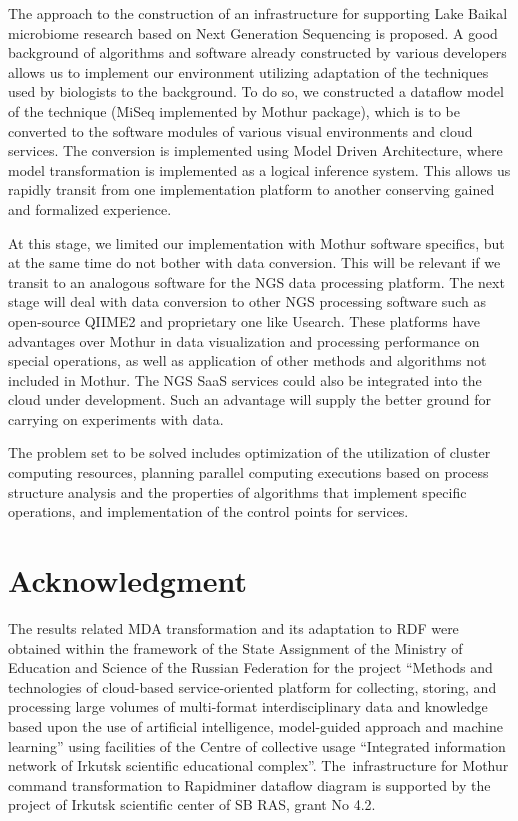 \documentclass[a4paper]{jpconf}
\begin{document}
The approach to the construction of an infrastructure for supporting Lake Baikal microbiome research based on Next Generation Sequencing is proposed. A good background of algorithms and software already constructed by various developers allows us to implement our environment utilizing adaptation of the techniques used by biologists to the background.  To do so, we constructed a dataflow model of the technique (MiSeq implemented by Mothur package), which is to be converted to the software modules of various visual environments and cloud services.  The conversion is implemented using Model Driven Architecture, where model transformation is implemented as a logical inference system. This allows us rapidly transit from one implementation platform to another conserving gained and formalized experience.

At this stage, we limited our implementation with Mothur software specifics, but at the same time do not bother with data conversion.  This will be relevant if we transit to an analogous software for the NGS data processing platform.  The next stage will deal with data conversion to other NGS processing software such as open-source QIIME2 and proprietary one like Usearch.  These platforms have advantages over Mothur in data visualization and processing performance on special operations, as well as application of other methods and algorithms not included in Mothur. The NGS SaaS services \cite{guo16,kwon15} could also be integrated into the cloud under development.  Such an advantage will supply the better ground for carrying on experiments with data.

The problem set to be solved includes optimization of the utilization of cluster computing resources, planning parallel computing executions based on process structure analysis and the properties of algorithms that implement specific operations, and implementation of the control points for services.

\section*{Acknowledgment}
The results related MDA transformation and its adaptation to RDF were obtained within the framework of the State Assignment of the Ministry of Education and Science of the Russian Federation for the project ``Methods and technologies of cloud-based service-oriented platform for collecting, storing, and processing large volumes of multi-format interdisciplinary data and knowledge based upon the use of artificial intelligence, model-guided approach and machine learning'' using facilities of the Centre of collective usage ``Integrated information network of Irkutsk scientific educational complex''. The~infrastructure  for Mothur command transformation to Rapidminer dataflow diagram is supported by the project of Irkutsk scientific center of SB RAS, grant No 4.2.
\end{document}

